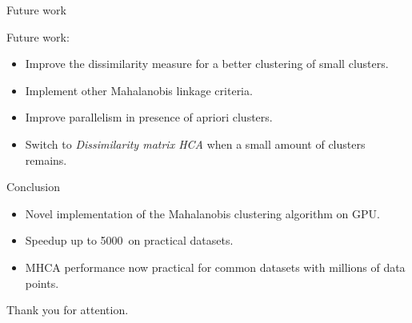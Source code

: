 \documentclass[10pt]{beamer}
\begin{document}
\begin{frame}{Future work}
	
	Future work: 
	\begin{itemize}
		\item Improve the dissimilarity measure for a better clustering
		of small clusters.
		\item Implement other Mahalanobis linkage criteria.
		\item Improve parallelism in presence of apriori clusters.
		\item Switch to \emph{Dissimilarity matrix HCA} when a small amount of clusters remains.
	\end{itemize}
	
\end{frame}

\begin{frame}{Conclusion}
	
	\begin{itemize}
		\item Novel implementation of the Mahalanobis clustering algorithm on GPU.
		\item Speedup up to 5000\texttimes\ on practical datasets.
		\item MHCA performance now practical for common datasets with millions of data points.
	\end{itemize}
	
\end{frame}

\begin{frame}[standout]
	
  Thank you for attention.

\end{frame}
\end{document}
